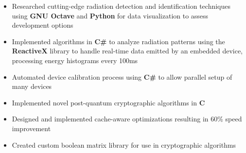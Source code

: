 \documentclass{moderncv}
\begin{document}
{\begin{itemize}
    \item Researched cutting-edge radiation detection and identification techniques using \textbf{GNU Octave} and \textbf{Python} for data visualization to assess development options
    \item Implemented algorithms in \textbf{C\#} to analyze radiation patterns using the \textbf{ReactiveX} library to handle real-time data emitted by an embedded device, processing energy histograms every 100ms
    \item Automated device calibration process using \textbf{C\#} to allow parallel setup of many devices
\end{itemize}}

{\begin{itemize}
    \item Implemented novel post-quantum cryptographic algorithms in \textbf{C}
    \item Designed and implemented cache-aware optimizations resulting in 60\% speed improvement
    \item Created custom boolean matrix library for use in cryptographic algorithms
\end{itemize}}

\begin{comment}
    \cventry{May 2019 - Aug 2019}{Secure Software Developer}{ESCRYPT}{Waterloo ON}{}
{\begin{itemize}
    \item Implemented asynchronous process in \textbf{C++} for periodically provisioning \textbf{X.509} certificates on-vehicle, improving anonymity in the system by enabling certificate swapping
    \item Wrote ETSI-compliant tests using \textbf{GoogleTest} framework to prove functionality
\end{itemize}}
\end{comment}
\end{document}
